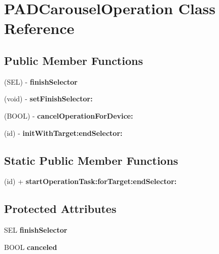 \hypertarget{interface_p_a_d_carousel_operation}{
\section{PADCarouselOperation Class Reference}
\label{interface_p_a_d_carousel_operation}
}
\subsection*{Public Member Functions}
\begin{DoxyCompactItemize}
\item 
\hypertarget{interface_p_a_d_carousel_operation_a2ae21ec2a62507b9e81b235805247e54}{
(SEL) -\/ {\bfseries finishSelector}}
\label{interface_p_a_d_carousel_operation_a2ae21ec2a62507b9e81b235805247e54}

\item 
\hypertarget{interface_p_a_d_carousel_operation_a19cac8973abae6e2ba59a1433564dffb}{
(void) -\/ {\bfseries setFinishSelector:}}
\label{interface_p_a_d_carousel_operation_a19cac8973abae6e2ba59a1433564dffb}

\item 
\hypertarget{interface_p_a_d_carousel_operation_aaddab68309a2a7f1a767b07241032da9}{
(BOOL) -\/ {\bfseries cancelOperationForDevice:}}
\label{interface_p_a_d_carousel_operation_aaddab68309a2a7f1a767b07241032da9}

\item 
\hypertarget{interface_p_a_d_carousel_operation_a1f284fb8ba84c26f76c218added552b5}{
(id) -\/ {\bfseries initWithTarget:endSelector:}}
\label{interface_p_a_d_carousel_operation_a1f284fb8ba84c26f76c218added552b5}

\end{DoxyCompactItemize}
\subsection*{Static Public Member Functions}
\begin{DoxyCompactItemize}
\item 
\hypertarget{interface_p_a_d_carousel_operation_a0aaa713ce3d64894942703dfcb5b9949}{
(id) + {\bfseries startOperationTask:forTarget:endSelector:}}
\label{interface_p_a_d_carousel_operation_a0aaa713ce3d64894942703dfcb5b9949}

\end{DoxyCompactItemize}
\subsection*{Protected Attributes}
\begin{DoxyCompactItemize}
\item 
\hypertarget{interface_p_a_d_carousel_operation_a0725e3b67f409c9dc897c6a518c0d746}{
SEL {\bfseries finishSelector}}
\label{interface_p_a_d_carousel_operation_a0725e3b67f409c9dc897c6a518c0d746}

\item 
\hypertarget{interface_p_a_d_carousel_operation_af9776fd65503afe98ca6aa594797f396}{
BOOL {\bfseries canceled}}
\label{interface_p_a_d_carousel_operation_af9776fd65503afe98ca6aa594797f396}

\end{DoxyCompactItemize}
